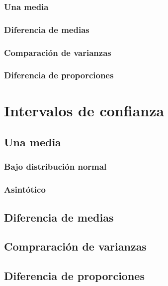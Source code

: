 \documentclass[
]{book}
\theoremstyle{definition}
\theoremstyle{definition}
\theoremstyle{definition}
\theoremstyle{definition}
\theoremstyle{remark}
\begin{document}
\hypertarget{una-media}{%
\subsection{Una media}\label{una-media}}

\hypertarget{diferencia-de-medias}{%
\subsection{Diferencia de medias}\label{diferencia-de-medias}}

\hypertarget{comparaciuxf3n-de-varianzas}{%
\subsection{Comparación de varianzas}\label{comparaciuxf3n-de-varianzas}}

\hypertarget{diferencia-de-proporciones}{%
\subsection{Diferencia de proporciones}\label{diferencia-de-proporciones}}

\hypertarget{intervalos-de-confianza}{%
\chapter{Intervalos de confianza}\label{intervalos-de-confianza}}

\hypertarget{una-media-1}{%
\section{Una media}\label{una-media-1}}

\hypertarget{bajo-distribuciuxf3n-normal}{%
\subsection{Bajo distribución normal}\label{bajo-distribuciuxf3n-normal}}

\hypertarget{asintuxf3tico}{%
\subsection{Asintótico}\label{asintuxf3tico}}

\hypertarget{diferencia-de-medias-1}{%
\section{Diferencia de medias}\label{diferencia-de-medias-1}}

\hypertarget{compraraciuxf3n-de-varianzas}{%
\section{Compraración de varianzas}\label{compraraciuxf3n-de-varianzas}}

\hypertarget{diferencia-de-proporciones-1}{%
\section{Diferencia de proporciones}\label{diferencia-de-proporciones-1}}

  
\end{document}
